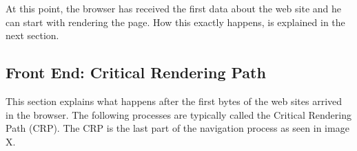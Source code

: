 
At this point, the browser has received the first data about the web site and he can start with rendering the page.
How this exactly happens, is explained in the next section.





















\subsection{Front End: Critical Rendering Path}

This section explains what happens after the first bytes of the web sites arrived in the browser.
The following processes are typically called the Critical Rendering Path (CRP).
The CRP is the last part of the navigation process as seen in image X.



